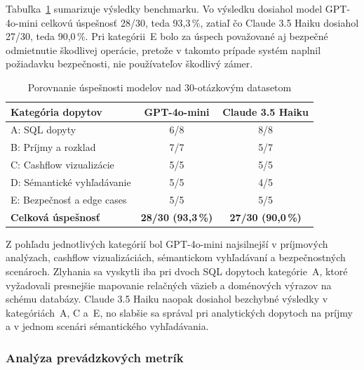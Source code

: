 Tabuľka~\ref{tab:model_comparison} sumarizuje výsledky benchmarku. Vo výsledku
dosiahol model GPT-4o-mini celkovú úspešnosť 28/30, teda 93{,}3\,\%, zatiaľ čo
Claude 3.5 Haiku dosiahol 27/30, teda 90{,}0\,\%. Pri kategórii~E bolo za úspech
považované aj bezpečné odmietnutie škodlivej operácie, pretože v takomto prípade systém
naplnil požiadavku bezpečnosti, nie používateľov škodlivý zámer.

\begin{table}[H]
	\centering
	\caption{Porovnanie úspešnosti modelov nad 30-otázkovým datasetom}
	\label{tab:model_comparison}
	\begin{tabular}{@{}lcc@{}}
		\toprule \textbf{Kategória dopytov} & \textbf{GPT-4o-mini}        & \textbf{Claude 3.5 Haiku}   \\
		\midrule A: SQL dopyty              & 6/8                         & 8/8                         \\
		B: Príjmy a rozklad                 & 7/7                         & 5/7                         \\
		C: Cashflow vizualizácie            & 5/5                         & 5/5                         \\
		D: Sémantické vyhľadávanie          & 5/5                         & 4/5                         \\
		E: Bezpečnosť a edge cases          & 5/5                         & 5/5                         \\
		\midrule \textbf{Celková úspešnosť} & \textbf{28/30 (93{,}3\,\%)} & \textbf{27/30 (90{,}0\,\%)} \\
		\bottomrule
	\end{tabular}
\end{table}

Z pohľadu jednotlivých kategórií bol GPT-4o-mini najsilnejší v príjmových analýzach,
cashflow vizualizáciách, sémantickom vyhľadávaní a bezpečnostných scenároch.
Zlyhania sa vyskytli iba pri dvoch SQL dopytoch kategórie~A, ktoré vyžadovali presnejšie
mapovanie relačných väzieb a doménových výrazov na schému databázy. Claude 3.5
Haiku naopak dosiahol bezchybné výsledky v kategóriách~A, C a~E, no slabšie sa
správal pri analytických dopytoch na príjmy a v jednom scenári sémantického
vyhľadávania.

\subsubsection{Analýza prevádzkových metrík}

